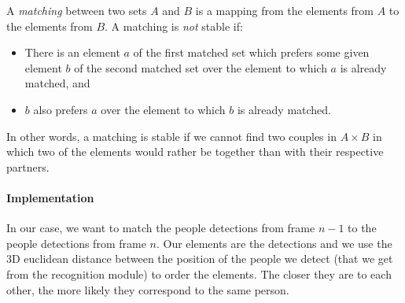 \documentclass[a4paper, twocolumn]{article}
\begin{document}
    A \textit{matching} between two sets $A$ and $B$ is a mapping from the elements from $A$ to the elements from $B$. A matching is \emph{not} stable if:
    \begin{itemize}
        \item There is an element $a$ of the first matched set which prefers some given element $b$ of the second matched set over the element to which $a$ is already matched, and
        \item $b$ also prefers $a$ over the element to which $b$ is already matched.
    \end{itemize}

    In other words, a matching is stable if we cannot find two couples in $A \times B$ in which two of the elements would rather be together than with their respective partners.

    \paragraph{Implementation} In our case, we want to match the people detections from frame $n-1$ to the people detections from frame $n$. Our elements are the detections and we use the 3D euclidean distance between the position of the people we detect (that we get from the recognition module) to order the elements. The closer they are to each other, the more likely they correspond to the same person.
\end{document}

